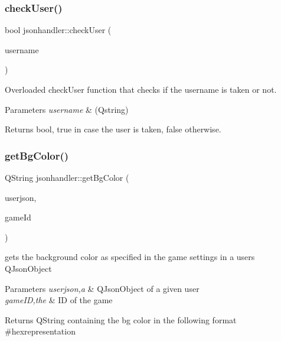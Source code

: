 \subsubsection{\texorpdfstring{check\+User()}{checkUser()}\hspace{0.1cm}{\footnotesize\ttfamily [2/2]}}
{\footnotesize\ttfamily bool jsonhandler\+::check\+User (\begin{DoxyParamCaption}\item[{Q\+String}]{username }\end{DoxyParamCaption})}



Overloaded check\+User function that checks if the username is taken or not. 


\begin{DoxyParams}{Parameters}
{\em username} & (Qstring) \\
\hline
\end{DoxyParams}
\begin{DoxyReturn}{Returns}
bool, true in case the user is taken, false otherwise. 
\end{DoxyReturn}
\mbox{\label{classjsonhandler_a3ebc5fcd86eeda6e9b54410986d268fc}} 
\subsubsection{\texorpdfstring{get\+Bg\+Color()}{getBgColor()}}
{\footnotesize\ttfamily Q\+String jsonhandler\+::get\+Bg\+Color (\begin{DoxyParamCaption}\item[{Q\+Json\+Object}]{userjson,  }\item[{Q\+String}]{game\+Id }\end{DoxyParamCaption})}



gets the background color as specified in the game settings in a user\textquotesingle{}s Q\+Json\+Object 


\begin{DoxyParams}{Parameters}
{\em userjson,a} & Q\+Json\+Object of a given user \\
\hline
{\em game\+ID,the} & ID of the game \\
\hline
\end{DoxyParams}
\begin{DoxyReturn}{Returns}
Q\+String containing the bg color in the following format \textquotesingle{}\#hexrepresentation\textquotesingle{} 
\end{DoxyReturn}
\mbox{\label{classjsonhandler_ad23eb6976b88403ec2b91f62cff8b0d0}} 
